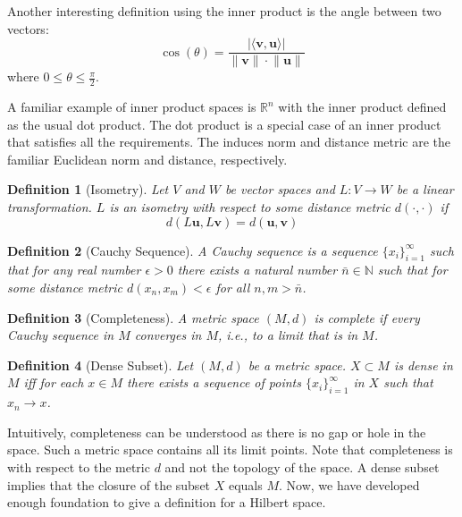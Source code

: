 \documentclass[conference]{IEEEtran}
\newtheorem{definition}{Definition}
\begin{document}
Another interesting definition using the inner product is the angle between two vectors:
\begin{equation}
\label{eq:csinq}
	\cos(\theta) = \frac{|\langle\mathbf{v}, \mathbf{u}\rangle|}{\lVert \mathbf{v} \rVert \cdot \lVert \mathbf{u} \rVert}
\end{equation}
where $0 \leq \theta \leq \frac{\pi}{2}$.

A familiar example of inner product spaces is $\mathbb{R}^n$ with the inner product defined as the usual dot product. The dot product is a special case of an inner product that satisfies all the requirements. The induces norm and distance metric are the familiar Euclidean norm and distance, respectively.

\begin{definition}[Isometry] Let $V$ and $W$ be vector spaces and $L: V \to W$ be a linear transformation. $L$ is an isometry with respect to some distance metric $d(\cdot, \cdot)$ if
\begin{equation}
	d(L\mathbf{u}, L\mathbf{v}) = d(\mathbf{u}, \mathbf{v})
\end{equation}
\end{definition}

\begin{definition}[Cauchy Sequence]
A Cauchy sequence is a sequence $\{x_i\}_{i=1}^{\infty}$ such that for any real number $\epsilon > 0$ there exists a natural number $\bar{n} \in \mathbb{N}$ such that for some distance metric $d(x_n, x_m) < \epsilon$ for all $n,m > \bar{n}$.
\end{definition}

\begin{definition}[Completeness]
A metric space $(M,d)$ is complete if every Cauchy sequence in $M$ converges in $M$, i.e., to a limit that is in $M$.
\end{definition}

\begin{definition}[Dense Subset]
Let $(M,d)$ be a metric space. $X \subset M$ is dense in $M$ iff for each $x\in M$ there exists a sequence of points $\{x_i\}_{i=1}^{\infty}$ in $X$ such that $x_n \to x$.
\end{definition}

Intuitively, completeness can be understood as there is no gap or hole in the space. Such a metric space contains all its limit points. Note that completeness is with respect to the metric $d$ and not the topology of the space. A dense subset implies that the closure of the subset $X$ equals $M$. Now, we have developed enough foundation to give a definition for a Hilbert space.
\end{document}
